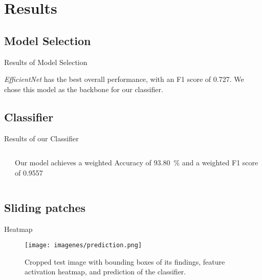 \section{Results}
\subsection{Model Selection}

\begin{frame}{Results of Model Selection}
    

    \emph{EfficientNet} has the best overall performance, with an F1 score of \num{0.727}. We chose this model as the backbone for our classifier.
\end{frame}

\subsection{Classifier}
\begin{frame}{Results of our Classifier}
    \begin{columns}
        \begin{column}{0.65\textwidth}
            
        \end{column}
        \begin{column}{0.35\textwidth}
            Our model achieves a weighted Accuracy of \SI{93.80}{\percent} and a weighted F1 score of \num{0.9557}
        \end{column}
    \end{columns}
    
\end{frame}

\subsection{Sliding patches}
\begin{frame}{Heatmap}
    \begin{figure}
        \centering
        \texttt{[image: imagenes/prediction.png]}
        \caption{Cropped test image with bounding boxes of its findings, feature activation heatmap, and prediction of the classifier.}
    \end{figure}
\end{frame}